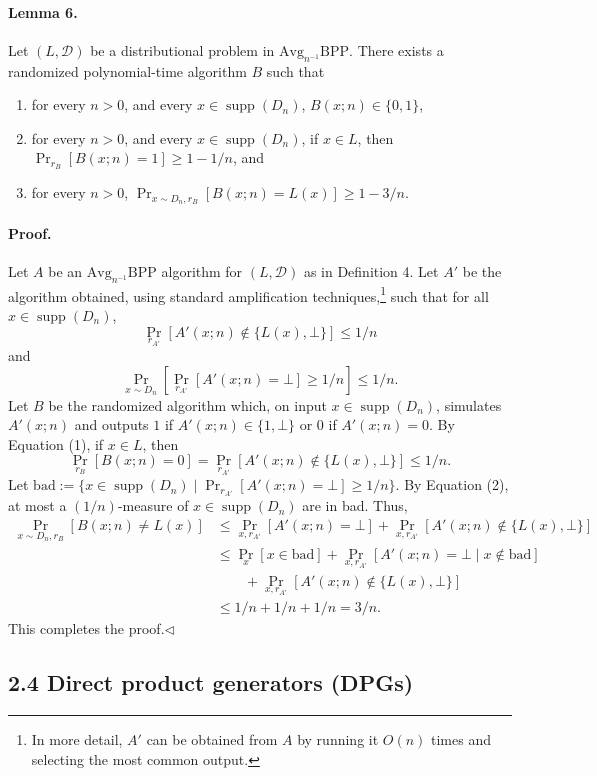 \documentclass[10pt,a4paper]{article}
\begin{document}
\paragraph{Lemma 6.} Let $(L,\mathcal D)$ be a distributional problem in $\mathrm{Avg}_{n^{-1}}\mathrm{BPP}$. There exists a randomized polynomial-time algorithm $B$ such that
\begin{enumerate}
\item for every $n>0$, and every $x\in\operatorname{supp}(D_n)$, $B(x;n)\in\{0,1\}$,
\item for every $n>0$, and every $x\in\operatorname{supp}(D_n)$, if $x\in L$, then $\Pr_{r_B}[B(x;n)=1]\geq1-1/n$, and
\item for every $n>0$, $\Pr_{x\sim D_n,r_B}[B(x;n)=L(x)]\geq1-3/n$.
\end{enumerate}
\paragraph{Proof.} Let $A$ be an $\mathrm{Avg}_{n^{-1}}\mathrm{BPP}$ algorithm for $(L,\mathcal D)$ as in Definition 4. Let $A'$ be the algorithm obtained, using standard amplification techniques,\footnote{In more detail, $A'$ can be obtained from $A$ by running it $O(n)$ times and selecting the most common output.} such that for all $x\in\operatorname{supp}(D_n)$,
\[\Pr_{r_{A'}}[A'(x;n)\notin\{L(x),\bot\}]\leq1/n\tag{1}\]
and
\[\Pr_{x\sim D_n}\left[\Pr_{r_{A'}}[A'(x;n)=\bot]\geq1/n\right]\leq1/n.\tag{2}\]
Let $B$ be the randomized algorithm which, on input $x\in\operatorname{supp}(D_n)$, simulates $A'(x;n)$ and outputs $1$ if $A'(x;n)\in\{1,\bot\}$ or $0$ if $A'(x;n)=0$. By Equation (1), if $x\in L$, then
\[\Pr_{r_B}[B(x;n)=0]=\Pr_{r_{A'}}[A'(x;n)\notin\{L(x),\bot\}]\leq1/n.\]
Let $\mathrm{bad}:=\{x\in\operatorname{supp}(D_n)\mid\Pr_{r_{A'}}[A'(x;n)=\bot]\geq1/n\}$. By Equation (2), at most a $(1/n)$-measure of $x\in\operatorname{supp}(D_n)$ are in bad. Thus,
\begin{align*}
\Pr_{x\sim D_n,r_B}[B(x;n)\neq L(x)]
&\leq\Pr_{x,r_{A'}}[A'(x;n)=\bot]+\Pr_{x,r_{A'}}[A'(x;n)\notin\{L(x),\bot\}]\\
&\leq\Pr_x[x\in\mathrm{bad}]+\Pr_{x,r_{A'}}[A'(x;n)=\bot\mid x\notin\mathrm{bad}]\\
&\qquad+\Pr_{x,r_{A'}}[A'(x;n)\notin\{L(x),\bot\}]\\
&\leq1/n+1/n+1/n=3/n.
\end{align*}
This completes the proof.\hfill$\triangleleft$
\subsection*{2.4 Direct product generators (DPGs)}
\end{document}
